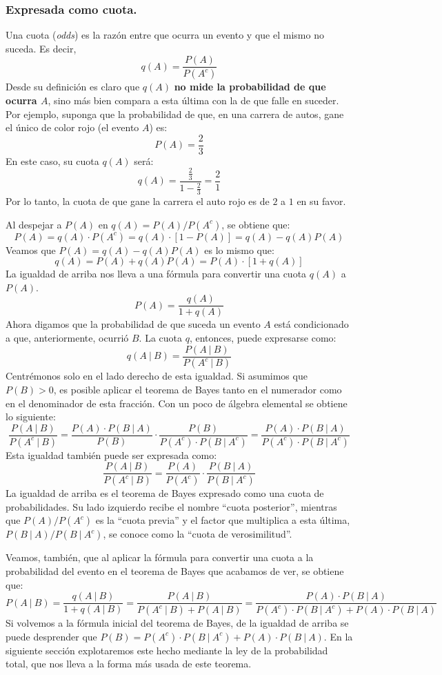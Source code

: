 \documentclass[12pt]{article}
\begin{document}
\subsubsection{Expresada como cuota.}

Una cuota (\textit{odds}) es la razón entre que ocurra un evento y que el mismo no suceda. Es decir,
\[
  q(A) = \frac{P(A)}{P(A^{c})}
\]
Desde su definición es claro que $q(A)$ \textbf{no mide la probabilidad de que ocurra $A$}, sino más bien compara a esta última con la de que falle en suceder. Por ejemplo, suponga que la probabilidad de que, en una carrera de autos, gane el único de color rojo (el evento $A$) es:
\[
  P(A) = \frac{2}{3}
\]
En este caso, su cuota $q(A)$ será:
\[
  q(A) = \frac{\frac{2}{3}}{1 - \frac{2}{3}} = \frac{2}{1}
\]
Por lo tanto, la cuota de que gane la carrera el auto rojo es de $2$ a $1$ en su favor.

Al despejar a $P(A)$ en $q(A) = P(A)/P(A^{c})$, se obtiene que:
\[
  P(A) = q(A) \cdot P(A^{c}) = q(A) \cdot [1 - P(A)] = q(A) - q(A)P(A)
\]
Veamos que $P(A) = q(A) - q(A)P(A)$ es lo mismo que:
\[
  q(A) = P(A) + q(A)P(A) = P(A) \cdot [1 + q(A)]
\]
La igualdad de arriba nos lleva a una fórmula para convertir una cuota $q(A)$ a $P(A)$.
\[
  P(A) = \frac{q(A)}{1 + q(A)}
\]
Ahora digamos que la probabilidad de que suceda un evento $A$ está condicionado a que, anteriormente, ocurrió $B$. La cuota $q$, entonces, puede expresarse como:
\[
  q(A \ | \ B) = \frac{P(A \ | \ B)}{P(A^{c} \ | \ B)}
\]
Centrémonos solo en el lado derecho de esta igualdad. Si asumimos que $P(B) > 0$, es posible aplicar el teorema de Bayes tanto en el numerador como en el denominador de esta fracción. Con un poco de álgebra elemental se obtiene lo siguiente:
\[
  \frac{P(A \ | \ B)}{P(A^{c} \ | \ B)} = \frac{P(A) \cdot P(B \ | \ A)}{P(B)} \cdot \frac{P(B)}{P(A^{c}) \cdot P(B \ | \ A^{c})}
                                        = \frac{P(A) \cdot P(B \ | \ A)}{P(A^{c}) \cdot P(B \ | \ A^{c})}
\]
Esta igualdad también puede ser expresada como:
\[
  \frac{P(A \ | \ B)}{P(A^{c} \ | \ B)} = \frac{P(A)}{P(A^{c})} \cdot \frac{P(B \ | \ A)}{P(B \ | \ A^{c})}
\]
La igualdad de arriba es el teorema de Bayes expresado como una cuota de probabilidades. Su lado izquierdo recibe el nombre ``cuota posterior'', mientras que $P(A)/P(A^{c})$ es la ``cuota previa'' y el factor que multiplica a esta última, $P(B \ | \ A)/P(B \ | \ A^{c})$, se conoce como la ``cuota de verosimilitud''.

Veamos, también, que al aplicar la fórmula para convertir una cuota a la probabilidad del evento en el teorema de Bayes que acabamos de ver, se obtiene que:
\[
  P(A \ | \ B) = \frac{q(A \ | \ B)}{1 + q(A \ | \ B)}
               = \frac{P(A \ | \ B)}{P(A^{c} \ | \ B) + P(A \ | \ B)}
               = \frac{P(A) \cdot P(B \ | \ A)}{P(A^{c}) \cdot P(B \ | \ A^{c}) + P(A) \cdot P(B \ | \ A)}
\]
Si volvemos a la fórmula inicial del teorema de Bayes, de la igualdad de arriba se puede desprender que $P(B) = P(A^{c}) \cdot P(B \ | \ A^{c}) + P(A) \cdot P(B \ | \ A)$. En la siguiente sección explotaremos este hecho mediante la ley de la probabilidad total, que nos lleva a la forma más usada de este teorema.
\end{document}
